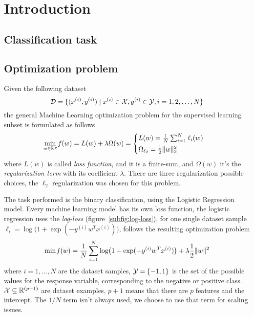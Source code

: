 \section{Introduction}\label{sc:intro}


\subsection{Classification task}

\subsection{Optimization problem}

Given the following dataset
\[
\mathcal{D}=\{(x^{(i)}, y^{(i)})\mid x^{(i)}\in\mathcal{X}, y^{(i)}\in\mathcal{Y}, i=1,2,\dots,N\}
\]
the general Machine Learning optimization problem for the supervised learning subset is formulated as follows
\[
\min_{w\in\mathbb{R}^p}\operatorname*{\mathit{f}}(w)=L(w)+\lambda\Omega(w)=
\begin{cases}
L(w)=\frac{1}{N}\sum_{i=1}^N\ell_i(w) \\[0.5ex]
\Omega_{\ell_2}=\frac{1}{2}\lVert w\rVert_2^2
\end{cases}
\]
where $L(w)$ is called \emph{loss function}, and it is a finite-sum, and $\Omega(w)$ it's the \emph{regularization term} with its coefficient $\lambda$. There are three regularization possible choices, the $\ell_2$ regularization was chosen for this problem.

The task performed is the binary classification, using the Logistic Regression model. Every machine learning model has its own loss function, the logistic regression uses the \emph{log-loss} (figure~\vref{subfig:log-loss}), for one single dataset sample $\ell_i=\log\bigl(1+\exp(-y^{(i)}w^Tx^{(i)})\bigr)$, follows the resulting optimization problem
\begin{equation}\label{eq:opt-prob}
\min\operatorname*{\mathit{f}}(w)=\frac{1}{N}\sum_{i=1}^N\log\bigl(1+\exp(-y^{(i)}w^Tx^{(i)})\bigr)+\lambda\frac{1}{2}\lVert w\rVert^2
\end{equation}
where $i=1,\dots,N$ are the dataset samples, $\mathcal{Y}=\{-1,1\}$ is the set of the possible values for the response variable, corresponding to the negative or positive class. $\mathcal{X}\subseteq\mathbb{R}^{(p+1)}$ are dataset examples, $p+1$ means that there are $p$ features and the intercept. The $1/N$ term isn't always used, we choose to use that term for scaling issues.

